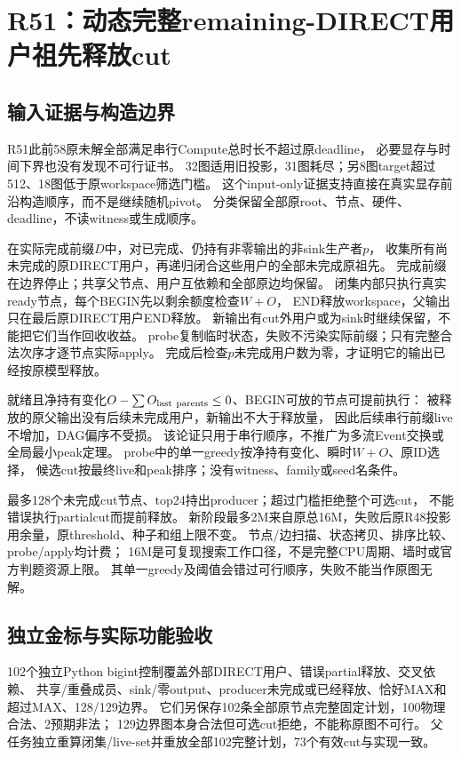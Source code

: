 \documentclass[UTF8,fontset=fandol,11pt]{ctexart}
\begin{document}
\section{R51：动态完整remaining-DIRECT用户祖先释放cut}
\subsection{输入证据与构造边界}
R51此前58原未解全部满足串行Compute总时长不超过原deadline，
必要显存与时间下界也没有发现不可行证书。
32图适用旧投影，31图耗尽；另8图target超过512、18图低于原workspace筛选门槛。
这个input-only证据支持直接在真实显存前沿构造顺序，而不是继续随机pivot。
分类保留全部原root、节点、硬件、deadline，不读witness或生成顺序。

在实际完成前缀$D$中，对已完成、仍持有非零输出的非sink生产者$p$，
收集所有尚未完成的原DIRECT用户，再递归闭合这些用户的全部未完成原祖先。
完成前缀在边界停止；共享父节点、用户互依赖和全部原边均保留。
闭集内部只执行真实ready节点，每个BEGIN先以剩余额度检查$W+O$，
END释放workspace，父输出只在最后原DIRECT用户END释放。
新输出有cut外用户或为sink时继续保留，不能把它们当作回收收益。
probe复制临时状态，失败不污染实际前缀；只有完整合法次序才逐节点实际apply。
完成后检查$p$未完成用户数为零，才证明它的输出已经按原模型释放。

就绪且净持有变化$O-\sum O_{\rm last\ parents}\le0$、BEGIN可放的节点可提前执行：
被释放的原父输出没有后续未完成用户，新输出不大于释放量，
因此后续串行前缀live不增加，DAG偏序不受损。
该论证只用于串行顺序，不推广为多流Event交换或全局最小peak定理。
probe中的单一greedy按净持有变化、瞬时$W+O$、原ID选择，
候选cut按最终live和peak排序；没有witness、family或seed名条件。

最多128个未完成cut节点、top24持出producer；超过门槛拒绝整个可选cut，
不能错误执行partialcut而提前释放。
新阶段最多2M来自原总16M，失败后原R48投影用余量，原threshold、种子和组上限不变。
节点/边扫描、状态拷贝、排序比较、probe/apply均计费；
16M是可复现搜索工作口径，不是完整CPU周期、墙时或官方判题资源上限。
其单一greedy及阈值会错过可行顺序，失败不能当作原图无解。

\subsection{独立金标与实际功能验收}
102个独立Python bigint控制覆盖外部DIRECT用户、错误partial释放、交叉依赖、
共享/重叠成员、sink/零output、producer未完成或已经释放、恰好MAX和超过MAX、128/129边界。
它们另保存102条全部原节点完整固定计划，100物理合法、2预期非法；
129边界图本身合法但可选cut拒绝，不能称原图不可行。
父任务独立重算闭集/live-set并重放全部102完整计划，73个有效cut与实现一致。
\end{document}
